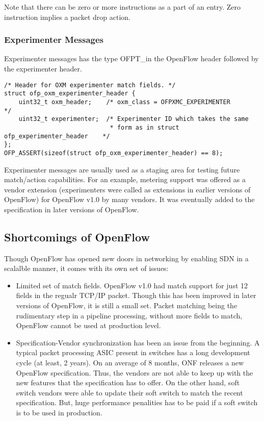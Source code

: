 \documentclass[a4paper]{article}
\begin{document}
Note that there can be zero or more instructions as a part of an entry. Zero instruction implies a packet drop action.

\subsubsection{Experimenter Messages}
Experimenter messages has the type OFPT_\EXPERIMENTER in the OpenFlow header followed by the experimenter header. 

\begin{verbatim}
/* Header for OXM experimenter match fields. */
struct ofp_oxm_experimenter_header {
    uint32_t oxm_header;    /* oxm_class = OFPXMC_EXPERIMENTER              */
    uint32_t experimenter;  /* Experimenter ID which takes the same
                             * form as in struct ofp_experimenter_header    */
};
OFP_ASSERT(sizeof(struct ofp_oxm_experimenter_header) == 8);
\end{verbatim}

Experimenter messages are usually used as a staging area for testing future match/action capabilities. For an example, metering support was offered as a vendor extension (experimenters were called as extensions in earlier versions of OpenFlow) for OpenFlow v1.0 by many vendors. It was eventually added to the specification in later versions of OpenFlow.

\subsection{Shortcomings of OpenFlow}
Though OpenFlow has opened new doors in networking by enabling SDN in a scalalble manner, it comes with its own set of issues:
\begin{itemize}
\item Limited set of match fields. OpenFlow v1.0 had match support for just 12 fields in the regualr TCP/IP packet. Though this has been improved in later versions of OpenFlow, it is still a small set. Packet matching being the rudimentary step in a pipeline processing, without more fields to match, OpenFlow cannot be used at production level.
\item Specification-Vendor synchronization has been an issue from the beginning. A typical packet processing ASIC present in switches has a long development cycle (at least, 2 years). On an average of 8 months, ONF releases a new OpenFlow specification. Thus, the vendors are not able to keep up with the new features that the specification has to offer. On the other hand, soft switch vendors were able to update their soft switch to match the recent specification. But, huge performance penalities has to be paid if a soft switch is to be used in production.
\end{itemize}
\end{document}
